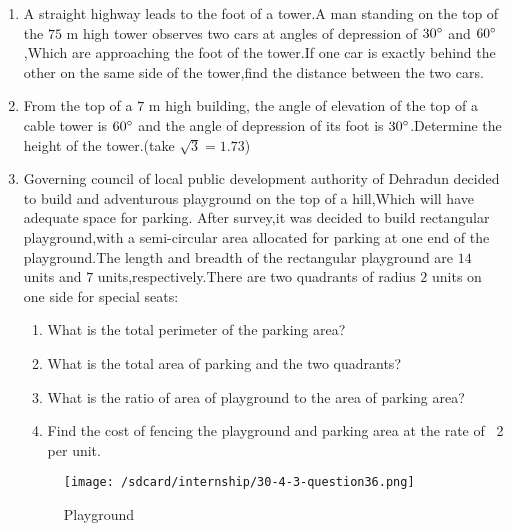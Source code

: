 \documentclass{article}
\begin{document}
\begin{enumerate}
\begin{enumerate}
            \end{enumerate}
    \item A straight highway leads to the foot of a tower.A man standing on the top of the $75$ m high tower observes two cars at angles of depression of $30\degree$ and $60\degree$,Which are approaching the foot of the tower.If one car is exactly behind the other on the same side of the tower,find the distance between the two cars.\newline
    \item From the top of a $7$ m high building, the angle of elevation of the top of a cable tower is $60\degree$ and the angle of depression of its foot is $30\degree$.Determine the height of the tower.(take $\sqrt{3}=1.73$)\newline
    \item Governing council of local public development authority of Dehradun decided to build and adventurous playground on the top of a hill,Which will have adequate space for parking.
    After survey,it was decided to build rectangular playground,with a semi-circular area allocated for parking at one end of the playground.The length and breadth of the rectangular playground are $14$ units and $7$ units,respectively.There are two quadrants of radius $2$ units on one side for special seats:\newline
            \begin{enumerate}
                \item What is the total perimeter of the parking area?\newline
                \item What is the total area of parking and the two quadrants?\newline
                \item What is the ratio of area of playground to the area of parking area?\newline
                \item Find the cost of fencing the playground and parking area at the rate of \rupee~2 per unit.
            \end{enumerate}
    \begin{figure}[!ht]
        \centering
        \texttt{[image: /sdcard/internship/30-4-3-question36.png]}
        \caption{Playground}
        \label{fig:enter-label}
    \end{figure}
\end{enumerate}
\end{document}
